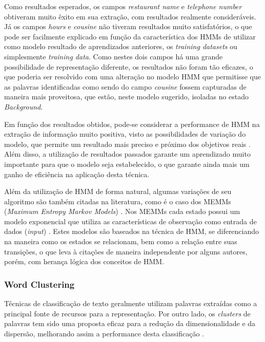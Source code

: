 Como resultados esperados, os campos \textit{restaurant name} e \textit{telephone number} obtiveram muito êxito em sua extração, com resultados realmente consideráveis. Já os campos \textit{hours} e \textit{cousine} não tiveram resultados muito satisfatórios, o que pode ser facilmente explicado em função da característica dos HMMs de utilizar como modelo resultado de aprendizados anteriores, os \textit{training datasets} ou simplesmente \textit{training data}. Como nestes dois campos há uma grande possibilidade de representação diferente, os resultados não foram tão eficazes, o que poderia ser resolvido com uma alteração no modelo HMM que permitisse que as palavras identificadas como sendo do campo \textit{cousine} fossem capturadas de maneira mais proveitosa, que estão, neste modelo sugerido, isoladas no estado \textit{Background}.

Em função dos resultados obtidos, pode-se considerar a performance de HMM na extração de informação muito positiva, visto as possibilidades de variação do modelo, que permite um resultado mais preciso e próximo dos objetivos reais \cite{Zhang-HMM-IE}. Além disso, a utilização de resultados passados garante um aprendizado muito importante para que o modelo seja estabelecido, o que garante ainda mais um ganho de eficiência na aplicação desta técnica.

Além da utilização de HMM de forma natural, algumas variações de seu algoritmo são também citadas na literatura, como é o caso dos MEMMs (\textit{Maximum Entropy Markov Models}) \cite{maximum-entropy}. Nos MEMMs cada estado possui um modelo exponencial que utiliza as características de observação como entrada de dados (\textit{input}) \cite{Lafferty-CRF}. Estes modelos são baseados na técnica de HMM, se diferenciando na maneira como os estados se relacionam, bem como a relação entre suas transições, o que leva à citações de maneira independente por alguns autores, porém, com herança lógica dos conceitos de HMM.

\subsubsection{Word Clustering}
\label{sssec:word-clustering}

Técnicas de classificação de texto geralmente utilizam palavras extraídas como a principal fonte de recursos para a representação. Por outro lado, os \textit{clusters} de palavras tem sido uma proposta eficaz para a redução da dimensionalidade e da dispersão, melhorando assim a performance desta classificação \cite{Han-Giles-WC}.

